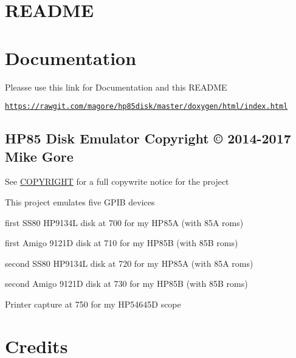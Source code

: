 \hypertarget{md_README_README}{}\section{R\+E\+A\+D\+ME}\label{md_README_README}
\section*{Documentation}


\begin{DoxyItemize}
\item Pleasse use this link for Documentation and this R\+E\+A\+D\+ME
\begin{DoxyItemize}
\item \href{https://rawgit.com/magore/hp85disk/master/doxygen/html/index.html}{\tt https\+://rawgit.\+com/magore/hp85disk/master/doxygen/html/index.\+html}
\end{DoxyItemize}
\end{DoxyItemize}

\subsection*{H\+P85 Disk Emulator Copyright \copyright{} 2014-\/2017 Mike Gore}


\begin{DoxyItemize}
\item See \hyperlink{md_COPYRIGHT}{C\+O\+P\+Y\+R\+I\+G\+HT} for a full copywrite notice for the project
\end{DoxyItemize}

This project emulates five G\+P\+IB devices
\begin{DoxyItemize}
\item first S\+S80 H\+P9134L disk at 700 for my H\+P85A (with 85A roms)
\item first Amigo 9121D disk at 710 for my H\+P85B (with 85B roms)
\item second S\+S80 H\+P9134L disk at 720 for my H\+P85A (with 85A roms)
\item second Amigo 9121D disk at 730 for my H\+P85B (with 85B roms)
\item Printer capture at 750 for my H\+P54645D scope
\end{DoxyItemize}





\section*{Credits}

